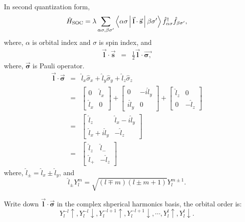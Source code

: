 In second quantization form,
\begin{equation}
\hat{H}_{\text{SOC}}=\lambda\sum_{\alpha\sigma,\beta\sigma^{\prime}}\Braket{\alpha\sigma|\vec{\mathbf{l}}\cdot\vec{\mathbf{s}}|\beta\sigma^{\prime}}\\
\hat{f}_{\alpha\sigma}^{\dagger}\hat{f}_{\beta\sigma^{\prime}},
\end{equation}
where, $\alpha$ is orbital index and $\sigma$ is spin index, and 
\begin{eqnarray}
\vec{\mathbf{l}}\cdot\vec{\mathbf{s}} & = & \frac{1}{2}\vec{\mathbf{l}}\cdot\vec{\mathbf{\mathbf{\sigma},}}
\end{eqnarray}
where, $\vec{\mathbf{\sigma}}$ is Pauli operator.
\begin{eqnarray*}
\vec{\mathbf{l}}\cdot\vec{\mathbf{\sigma}} & = & \hat{l}_{x}\hat{\sigma}_{x}+\hat{l}_{y}\hat{\sigma}_{y}+\hat{l}_{z}\hat{\sigma}_{z}\\
 & = & \left[\begin{array}{cc}
0 & \hat{l}_{x}\\
\hat{l}_{x} & 0
\end{array}\right]+\left[\begin{array}{cc}
0 & -i\hat{l}_{y}\\
i\hat{l}_{y} & 0
\end{array}\right]+\left[\begin{array}{cc}
\hat{l}_{z} & 0\\
0 & -\hat{l}_{z}
\end{array}\right]\\
 & = & \left[\begin{array}{cc}
\hat{l}_{z} & \hat{l}_{x}-i\hat{l}_{y}\\
\hat{l}_{x}+i\hat{l}_{y} & -\hat{l}_{z}
\end{array}\right]\\
 & = & \left[\begin{array}{cc}
\hat{l}_{z} & \hat{l}_{-}\\
\hat{l}_{+} & -\hat{l}_{z}
\end{array}\right]
\end{eqnarray*}
where, $\hat{l}_{\pm}=\hat{l}_{x}\pm\hat{l}_{y}$, and
\begin{equation}
\hat{l}_{\pm}Y_{l}^{m}=\sqrt{(l\mp m)(l\pm m+1)}Y_{l}^{m\pm1}.
\end{equation}

Write down $\vec{\mathbf{l}}\cdot\vec{\mathbf{\sigma}}$ in the complex shperical harmonics basis, the orbital order is:
\begin{equation}
Y_{l}^{-l}\uparrow,Y_{l}^{-l}\downarrow,Y_{l}^{-l+1}\uparrow,Y_{l}^{-l+1}\downarrow,\cdots,Y_{l}^{l}\uparrow,Y_{l}^{l}\downarrow.
\end{equation}

